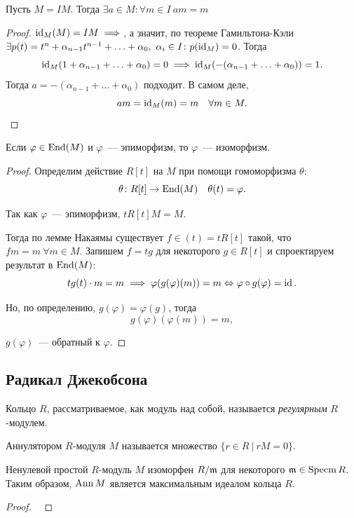 	\begin{theorem} 
		Пусть $M = IM$. Тогда $\exists a \in M\colon \forall m \in I \  am = m$
	\end{theorem}
	\begin{proof}
		$\operatorname{id}_{M}(M) = IM \implies $, а значит, по теореме Гамильтона-Кэли $\exists p(t) = t^n + \alpha_{n - 1}t^{n - 1} + \ldots + \alpha_0, \ \alpha_i \in I \colon p(\operatorname{id}_{M}) = 0$. Тогда 
		\[
			\operatorname{id}_{M}(1 + \alpha_{n - 1} + \ldots + \alpha_{0}) = 0 \implies \operatorname{id}_{M}(-(\alpha_{n - 1} + \ldots  + \alpha_0)) = 1.
		\]
		Тогда $a = -(\alpha_{n - 1} + \ldots  + \alpha_0)$ подходит. В самом деле, 
		\[
			am = \operatorname{id}_{M}(m) = m \quad \forall m \in M.
		\]
	\end{proof}

	\begin{corollary}
		Если $\varphi \in \operatorname{End}(M)$ и $\varphi$~--- эпиморфизм, то $\varphi$~--- изоморфизм. 
	\end{corollary}

	\begin{proof}
		Определим действие $R[t]$ на $M$ при помощи гомоморфизма $\theta$:
		\[
			\theta\colon R[t] \to \operatorname{End}(M) \quad \theta(t) = \varphi.
		\]

		Так как $\varphi$~--- эпиморфизм, $tR[t]M = M$. 

		Тогда по лемме Накаямы существует $f \in (t) = t R[t]$ такой, что $fm = m \ \forall m \in M$. Запишем $f = tg$ для некоторого $g \in R[t]$ и спроектируем результат в $\operatorname{End}(M)$:
		\[
			t g(t) \cdot m = m \implies \varphi(g(\varphi)(m)) = m \Leftrightarrow \varphi \circ g(\varphi) = \operatorname{id}.
		\]

		Но, по определению, $g(\varphi) = \varphi(g)$, тогда 
		\[
			g(\varphi)(\varphi(m)) = m,
		\]

		$g(\varphi)$~--- обратный к $\varphi$.
	\end{proof}

	\subsection{Радикал Джекобсона}

	Кольцо $R$, рассматриваемое, как модуль над собой, называется \emph{регулярным} $R$-модулем. 

	\begin{definition} 
		Аннулятором $R$-модуля $M$ называется множество $\{ r \in R \ \vert \ rM = 0 \}$.
	\end{definition}

	\begin{lemma} 
		Ненулевой простой $R$-модуль $M$ изоморфен $R/\mathfrak{m}$ для некоторого $\mathfrak{m} \in \operatorname{Specm}{R}$. Таким образом, $\operatorname{Ann}{M}$ является максимальным идеалом кольца $R$. 
	\end{lemma}

	\begin{proof} \ 
	\vspace{30mm}
	\end{proof}




